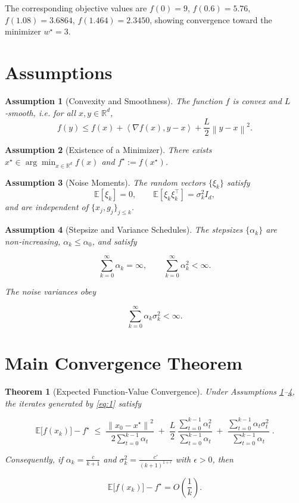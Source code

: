 \documentclass{article}
\newtheorem{theorem}{Theorem}
\newtheorem{assumption}{Assumption}
\newcommand{\E}{\mathbb{E}}
\newcommand{\R}{\mathbb{R}}
\newcommand{\norm}[1]{\left\|#1\right\|}
\newcommand{\inner}[2]{\left\langle #1,#2\right\rangle}
\begin{document}
The corresponding objective values are $f(0)=9$, $f(0.6)=5.76$, $f(1.08)=3.6864$, $f(1.464)=2.3450$, showing convergence toward the minimizer $w^\star=3$.

\newpage
\section*{Assumptions}
\begin{assumption}[Convexity and Smoothness]\label{ass:convex}
The function $f$ is convex and $L$‑smooth, i.e. for all $x,y\in\R^d$,
\[
f(y)\le f(x)+\inner{\nabla f(x)}{y-x}+\frac{L}{2}\norm{y-x}^2 .
\tag{3}
\]
\end{assumption}

\begin{assumption}[Existence of a Minimizer]\label{ass:opt}
There exists $x^\star\in\arg\min_{x\in\R^d}f(x)$ and $f^\star:=f(x^\star)$.
\end{assumption}

\begin{assumption}[Noise Moments]\label{ass:noise}
The random vectors $\{\xi_k\}$ satisfy  
\[
\E[\xi_k]=0,\qquad \E[\xi_k\xi_k^\top]=\sigma_k^{2} I_d ,
\tag{4}
\]
and are independent of $\{x_j,g_j\}_{j\le k}$.
\end{assumption}

\begin{assumption}[Stepsize and Variance Schedules]\label{ass:schedule}
The stepsizes $\{\alpha_k\}$ are non‑increasing, $\alpha_k\le\alpha_0$, and satisfy  

\[
\sum_{k=0}^{\infty}\alpha_k =\infty,\qquad 
\sum_{k=0}^{\infty}\alpha_k^2<\infty .
\tag{5}
\]

The noise variances obey  

\[
\sum_{k=0}^{\infty}\alpha_k\sigma_k^{2}<\infty .
\tag{6}
\]
\end{assumption}

\section*{Main Convergence Theorem}
\begin{theorem}[Expected Function‑Value Convergence]\label{thm:conv}
Under Assumptions \ref{ass:convex}–\ref{ass:schedule}, the iterates generated by \eqref{eq:1} satisfy  

\[
\E\!\bigl[f(x_k)\bigr]-f^\star
\;\le\;
\frac{\norm{x_0-x^\star}^2}{2\sum_{t=0}^{k-1}\alpha_t}
\;+\;
\frac{L}{2}\,\frac{\sum_{t=0}^{k-1}\alpha_t^2}{\sum_{t=0}^{k-1}\alpha_t}
\;+\;
\frac{\sum_{t=0}^{k-1}\alpha_t\sigma_t^{2}}{\sum_{t=0}^{k-1}\alpha_t}\; .
\tag{7}
\]

Consequently, if $\alpha_k=\frac{c}{k+1}$ and $\sigma_k^{2}= \frac{c'}{(k+1)^{1+\epsilon}}$ with $\epsilon>0$, then  

\[
\E\!\bigl[f(x_k)\bigr]-f^\star = O\!\left(\frac{1}{k}\right) .
\tag{8}
\]
\end{theorem}
\end{document}
